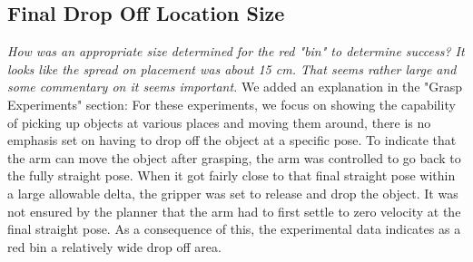 \documentclass[letterpaper, 10 pt, twocolumn, conference]{article}
\begin{document}
\subsection{Final Drop Off Location Size}
\textit{How was an appropriate size determined for the red "bin" to determine success? It looks like the spread on placement was about 15 cm. That seems rather large and some commentary on it seems important.}
%
We added an explanation in the "Grasp Experiments" section: For these experiments, we focus on showing the capability of picking up objects at various places and moving them around, there is no emphasis set on having to drop off the object at a specific pose. To indicate that the arm can move the object after grasping, the arm was controlled to go back to the fully straight pose. When it got fairly close to that final straight pose within a large allowable delta, the gripper was set to release and drop the object. It was not ensured by the planner that the arm had to first settle to zero velocity at the final straight pose. As a consequence of this, the experimental data indicates as a red bin a relatively wide drop off area. 
%
\end{document}
